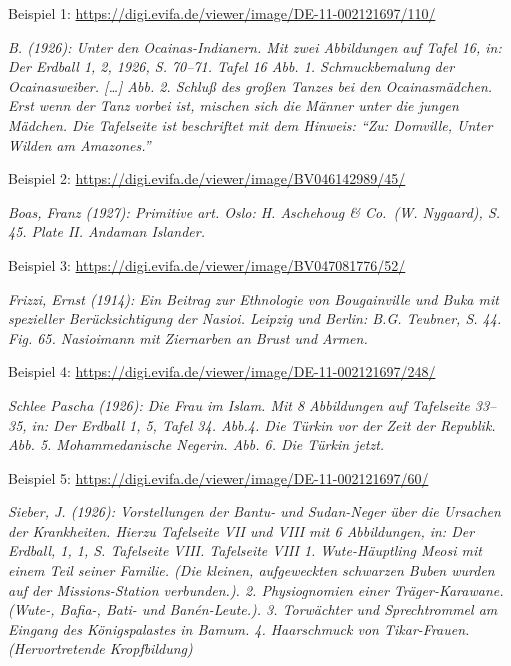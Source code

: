 \documentclass[a4paper,
fontsize=11pt,
oneside,
numbers=noperiodatend,
parskip=half-,
bibliography=totoc,
final
]{scrartcl}
\begin{document}
Beispiel 1:
\url{https://digi.evifa.de/viewer/image/DE-11-002121697/110/}

\emph{B. (1926): Unter den Ocainas-Indianern. Mit zwei Abbildungen auf
Tafel 16, in: Der Erdball 1, 2, 1926, S. 70--71. Tafel 16 Abb. 1.
Schmuckbemalung der Ocainasweiber. {[}\ldots{]} Abb. 2. Schluß des
großen Tanzes bei den Ocainasmädchen. Erst wenn der Tanz vorbei ist,
mischen sich die Männer unter die jungen Mädchen. Die Tafelseite ist
beschriftet mit dem Hinweis: \enquote{Zu: Domville, Unter Wilden am
Amazones.}}

Beispiel 2: \url{https://digi.evifa.de/viewer/image/BV046142989/45/}

\emph{Boas, Franz (1927): Primitive art. Oslo: H. Aschehoug \& Co.~(W.
Nygaard), S. 45. Plate II. Andaman Islander.}

Beispiel 3: \url{https://digi.evifa.de/viewer/image/BV047081776/52/}

\emph{Frizzi, Ernst (1914): Ein Beitrag zur Ethnologie von Bougainville
und Buka mit spezieller Berücksichtigung der Nasioi. Leipzig und Berlin:
B.G. Teubner, S. 44. Fig. 65. Nasioimann mit Ziernarben an Brust und
Armen.}

Beispiel 4:
\url{https://digi.evifa.de/viewer/image/DE-11-002121697/248/}

\emph{Schlee Pascha (1926): Die Frau im Islam. Mit 8 Abbildungen auf
Tafelseite 33--35, in: Der Erdball 1, 5, Tafel 34. Abb.4. Die Türkin vor
der Zeit der Republik. Abb. 5. Mohammedanische Negerin. Abb. 6. Die
Türkin jetzt.}

Beispiel 5: \url{https://digi.evifa.de/viewer/image/DE-11-002121697/60/}

\emph{Sieber, J. (1926): Vorstellungen der Bantu- und Sudan-Neger über
die Ursachen der Krankheiten. Hierzu Tafelseite VII und VIII mit 6
Abbildungen, in: Der Erdball, 1, 1, S. Tafelseite VIII. Tafelseite VIII
1. Wute-Häuptling Meosi mit einem Teil seiner Familie. (Die kleinen,
aufgeweckten schwarzen Buben wurden auf der Missions-Station
verbunden.). 2. Physiognomien einer Träger-Karawane. (Wute-, Bafia-,
Bati- und Banén-Leute.). 3. Torwächter und Sprechtrommel am Eingang des
Königspalastes in Bamum. 4. Haarschmuck von Tikar-Frauen.
(Hervortretende Kropfbildung)}

\vspace*{2em}
\end{document}
